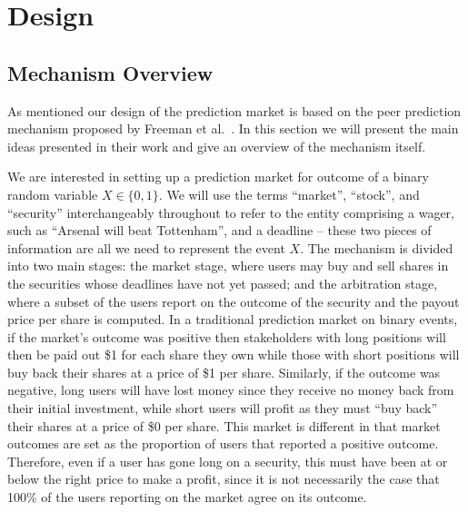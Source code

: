 \section{Design}



\label{sec:design}

\subsection{Mechanism Overview}

As mentioned our design of the prediction market is based on the peer
prediction mechanism proposed by Freeman et al.~\cite{Freeman2017}. In this
section we will present the main ideas presented in their work and give an
overview of the mechanism itself.

We are interested in setting up a prediction market for outcome of a binary
random variable $X \in \{0,1\}$. We will use the terms ``market'', ``stock'',
and ``security'' interchangeably throughout to refer to the entity comprising a
wager, such as ``Arsenal will beat Tottenham'', and a deadline -- these two
pieces of information are all we need to represent the event $X$. The mechanism
is divided into two main stages: the market stage, where users may buy and sell
shares in the securities whose deadlines have not yet passed; and the
arbitration stage, where a subset of the users report on the outcome of the
security and the payout price per share is computed. In a traditional
prediction market on binary events, if the market's outcome was positive then
stakeholders with long positions will then be paid out \$1 for each share they
own while those with short positions will buy back their shares at a price of
\$1 per share. Similarly, if the outcome was negative, long users will have
lost money since they receive no money back from their initial investment,
while short users will profit as they must ``buy back'' their shares at a price
of \$0 per share. This market is different in that market outcomes are set as
the proportion of users that reported a positive outcome. Therefore, even if a
user has gone long on a security, this must have been at or below the right
price to make a profit, since it is not necessarily the case that 100\% of the
users reporting on the market agree on its outcome.

